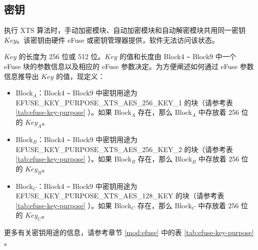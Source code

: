 \documentclass[main\_\_CN.tex]{subfiles}
\begin{document}
\subsection{密钥}
\label{sec:extmemncr-key}

执行 XTS 算法时，手动加密模块、自动加密模块和自动解密模块共用同一密钥 \begin{math}\mathit{Key}\end{math}。该密钥由硬件 eFuse 或密钥管理器提供，软件无法访问该状态。

\begin{math}\mathit{Key}\end{math} 的长度为 256 位或 512 位。\begin{math}\mathit{Key}\end{math} 的值和长度由 Block4 \verb+~+ Block9 中一个 eFuse 块的参数信息以及相应的 eFuse 参数决定。为方便阐述如何通过 eFuse 参数信息推导出 \begin{math}\mathit{Key}\end{math} 的值，现定义：
\begin{itemize}
    \item Block$_A$：Block4 \verb+~+ Block9 中密钥用途为 EFUSE\_KEY\_PURPOSE\_XTS\_AES\_256\_KEY\_1 的块（请参考表 \ref{tab:efuse-key-purpose} \textit{}）。如果 Block$_A$ 存在，那么 Block$_A$ 中存放着 256 位的 \begin{math}\mathit{Key}_{A}\end{math}。
    \item Block$_B$：Block4 \verb+~+ Block9 中密钥用途为 EFUSE\_KEY\_PURPOSE\_XTS\_AES\_256\_KEY\_2 的块（请参考表 \ref{tab:efuse-key-purpose} \textit{}）。如果 Block$_B$ 存在，那么 Block$_B$ 中存放着 256 位的 \begin{math}\mathit{Key}_{B}\end{math}。
    \item Block$_C$：Block4 \verb+~+ Block9 中密钥用途为 EFUSE\_KEY\_PURPOSE\_XTS\_AES\_128\_KEY 的块（请参考表 \ref{tab:efuse-key-purpose} \textit{}）。如果 Block$_C$ 存在，那么 Block$_C$ 中存放着 256 位的 \begin{math}\mathit{Key}_{C}\end{math}。
\end{itemize}




更多有关密钥用途的信息，请参考章节 \ref{mod:efuse} \textit{} 中的表 \ref{tab:efuse-key-purpose} \textit{}。
\end{document}
